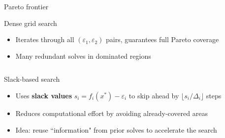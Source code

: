 \documentclass{beamer}
\begin{document}
\begin{frame}{Pareto frontier}
    \begin{block}{Dense grid search}
        \begin{itemize}
            \item Iterates through all $(\varepsilon_1,\varepsilon_2)$ pairs, guarantees full Pareto coverage
            \item[$\star$] Many redundant solves in dominated regions
        \end{itemize}
    \end{block}

    \begin{columns}[T]

    \begin{block}{Slack-based search}
        \begin{itemize}
            \item Uses \textbf{slack values} $s_i = f_i(x^*) - \varepsilon_i$ to skip ahead by $\lfloor s_i / \Delta_i \rfloor$ steps
            \item Reduces computational effort by avoiding already-covered areas
            \item Idea: reuse ``information" from prior solves to accelerate the search
        \end{itemize}
    \end{block}

    \vspace{1em}
    \centering
    \end{columns}
\end{frame}
\end{document}
